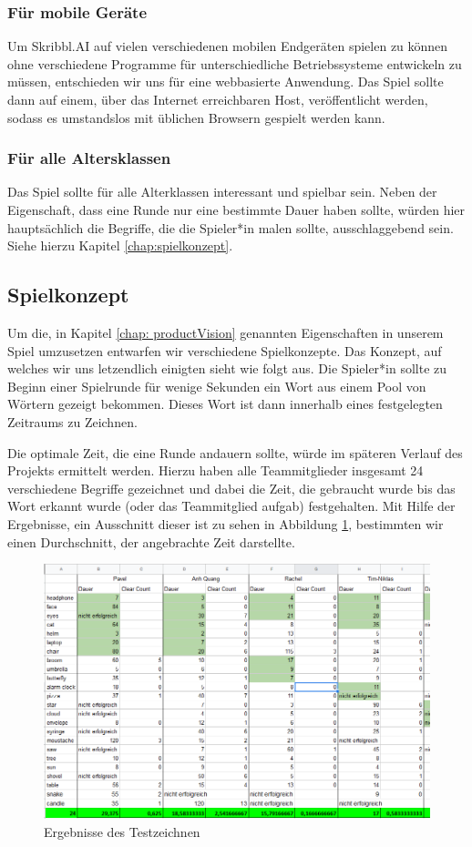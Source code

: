 \documentclass[11pt]{article}
\begin{document}
\subsubsection{Für mobile Geräte}
Um Skribbl.AI auf vielen verschiedenen mobilen Endgeräten spielen zu können ohne verschiedene Programme für unterschiedliche Betriebssysteme entwickeln zu müssen, entschieden wir uns für eine webbasierte Anwendung. Das Spiel sollte dann auf einem, über das Internet erreichbaren Host, veröffentlicht werden, sodass es umstandslos mit üblichen Browsern gespielt werden kann.
\subsubsection{Für alle Altersklassen}
Das Spiel sollte für alle Alterklassen interessant und spielbar sein. Neben der Eigenschaft, dass eine Runde nur eine bestimmte Dauer haben sollte, würden hier hauptsächlich die Begriffe, die die Spieler*in malen sollte, ausschlaggebend sein. Siehe hierzu Kapitel \ref{chap:spielkonzept}.
\subsection{Spielkonzept}
Um die, in Kapitel \ref{chap: productVision} genannten Eigenschaften in unserem Spiel umzusetzen entwarfen wir verschiedene Spielkonzepte. Das Konzept, auf welches wir uns letzendlich einigten sieht wie folgt aus.
Die Spieler*in sollte zu Beginn einer Spielrunde für wenige Sekunden ein Wort aus einem Pool von Wörtern gezeigt bekommen. Dieses Wort ist dann innerhalb eines festgelegten Zeitraums zu Zeichnen.

Die optimale Zeit, die eine Runde andauern sollte, würde im späteren Verlauf des Projekts ermittelt werden. Hierzu haben alle Teammitglieder insgesamt 24 verschiedene Begriffe gezeichnet und dabei die Zeit, die gebraucht wurde bis das Wort erkannt wurde (oder das Teammitglied aufgab) festgehalten. Mit Hilfe der Ergebnisse, ein Ausschnitt dieser ist zu sehen in Abbildung \ref{fig:testResults}, bestimmten wir einen Durchschnitt, der angebrachte Zeit darstellte. 

\label{chap:spielkonzept}
\begin{figure}[ht]
\centering
\includegraphics[width=1\textwidth]{images/blindtesting.png}
\caption{\label{fig:testResults}Ergebnisse des Testzeichnen}
\end{figure}
\end{document}
